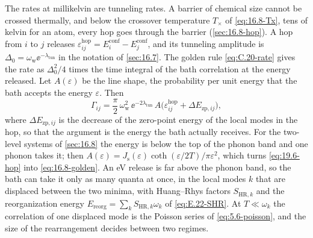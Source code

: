 The rates at millikelvin are tunneling rates. A barrier of chemical size cannot be crossed thermally, and below the crossover temperature $T_\times$ of \cref{eq:16.8-Tx}, tens of kelvin for an atom, every hop goes through the barrier (\cref{sec:16.8-hop}). A hop from $i$ to $j$ releases $\varepsilon^{\mathrm{hop}}_{ij} = E^{\mathrm{conf}}_i - E^{\mathrm{conf}}_j$, and its tunneling amplitude is $\Delta_0 = \omega_{\mathrm{w}}\ee^{-\lambda_{\mathrm{tun}}}$ in the notation of \cref{sec:16.7}. The golden rule \cref{eq:C.20-rate} gives the rate as $\Delta_0^2/4$ times the time integral of the bath correlation at the energy released. Let $A(\varepsilon)$ be the line shape, the probability per unit energy that the bath accepts the energy $\varepsilon$. Then
\begin{equation}
  \varGamma_{ij} = \frac{\pi}{2}\,\omega_{\mathrm{w}}^2\,\ee^{-2\lambda_{\mathrm{tun}}}\,A\bigl(\varepsilon^{\mathrm{hop}}_{ij} + \Delta E_{\mathrm{zp},ij}\bigr) ,
  \label{eq:19.6-hop}
\end{equation}
where $\Delta E_{\mathrm{zp},ij}$ is the decrease of the zero-point energy of the local modes in the hop, so that the argument is the energy the bath actually receives. For the two-level systems of \cref{sec:16.8} the energy is below the top of the phonon band and one phonon takes it; then $A(\varepsilon) = J_{\mathrm{s}}(\varepsilon)\coth(\varepsilon/2T)/\pi\varepsilon^2$, which turns \cref{eq:19.6-hop} into \cref{eq:16.8-golden}. An eV release is far above the phonon band, so the bath can take it only as many quanta at once, in the local modes $k$ that are displaced between the two minima, with Huang--Rhys factors $S_{\mathrm{HR},k}$ and the reorganization energy $E_{\mathrm{reorg}} = \sum_kS_{\mathrm{HR},k}\omega_k$ of \cref{eq:E.22-SHR}. At $T \ll \omega_k$ the correlation of one displaced mode is the Poisson series of \cref{eq:5.6-poisson}, and the size of the rearrangement decides between two regimes.

